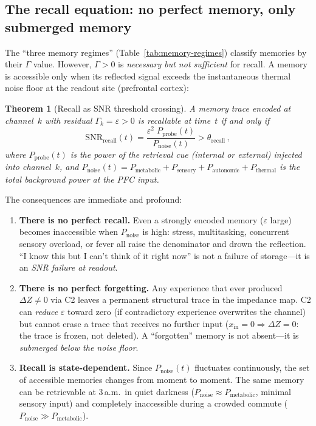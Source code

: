 \documentclass[aps,pre,twocolumn,superscriptaddress,floatfix]{revtex4-2}
\newtheorem{theorem}{Theorem}
\begin{document}
\subsection{The recall equation: no perfect memory, only
  submerged memory}
\label{sec:recall-snr}

The ``three memory regimes'' (Table~\ref{tab:memory-regimes})
classify memories by their $\Gamma$ value.
However, $\Gamma > 0$ is \emph{necessary but not sufficient}
for recall.
A memory is accessible only when its reflected signal
exceeds the instantaneous thermal noise floor at the
readout site (prefrontal cortex):

\begin{theorem}[Recall as SNR threshold crossing]
\label{thm:recall-snr}
A memory trace encoded at channel~$k$ with residual
$\Gamma_k = \varepsilon > 0$ is recallable at time~$t$
if and only if
\begin{equation}
  \mathrm{SNR}_{\text{recall}}(t)
  = \frac{\varepsilon^2\;P_{\text{probe}}(t)}
         {P_{\text{noise}}(t)}
  > \theta_{\text{recall}}\,,
  \label{eq:recall-snr}
\end{equation}
where $P_{\text{probe}}(t)$ is the power of the
retrieval cue (internal or external) injected into
channel~$k$, and
$P_{\text{noise}}(t) = P_{\text{metabolic}} +
P_{\text{sensory}} + P_{\text{autonomic}} +
P_{\text{thermal}}$ is the total background power
at the PFC input.
\end{theorem}

\noindent
The consequences are immediate and profound:

\begin{enumerate}
  \item \textbf{There is no perfect recall.}
    Even a strongly encoded memory ($\varepsilon$
    large) becomes inaccessible when
    $P_{\text{noise}}$ is high: stress, multitasking,
    concurrent sensory overload, or fever all raise the
    denominator and drown the reflection.
    ``I know this but I can't think of it right now''
    is not a failure of storage---it is an
    \emph{SNR failure at readout}.

  \item \textbf{There is no perfect forgetting.}
    Any experience that ever produced
    $\Delta Z \neq 0$ via C2 leaves a permanent
    structural trace in the impedance map.
    C2 can \emph{reduce} $\varepsilon$ toward zero
    (if contradictory experience overwrites the
    channel) but cannot erase a trace that receives
    no further input ($x_{\text{in}} = 0 \Rightarrow
    \Delta Z = 0$: the trace is frozen, not deleted).
    A ``forgotten'' memory is not absent---it is
    \emph{submerged below the noise floor}.

  \item \textbf{Recall is state-dependent.}
    Since $P_{\text{noise}}(t)$ fluctuates continuously,
    the set of accessible memories changes from moment
    to moment.
    The same memory can be retrievable at 3\,a.m.\
    in quiet darkness
    ($P_{\text{noise}} \approx P_{\text{metabolic}}$,
    minimal sensory input)
    and completely inaccessible during a crowded
    commute ($P_{\text{noise}} \gg P_{\text{metabolic}}$).
\end{enumerate}
\end{document}

